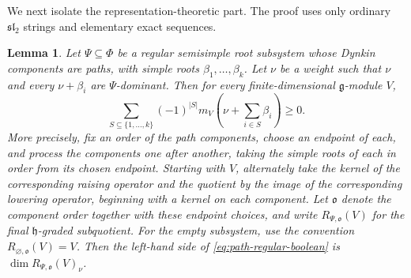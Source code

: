 \documentclass[11pt]{article}
\newtheorem{lemma}[lemma]{Lemma}
\theoremstyle{definition}
\theoremstyle{remark}
\newcommand{\Raiz}{\Phi}
\begin{document}
We next isolate the representation-theoretic part.  The proof uses only
ordinary $\mathfrak{sl}_2$ strings and elementary exact sequences.

\begin{lemma}\label{lem:path-regular-boolean}
Let $\Psi\subseteq\Raiz$ be a regular semisimple root subsystem whose Dynkin
components are paths, with simple roots $\beta_1,\ldots,\beta_k$.  Let $\nu$
be a weight such that $\nu$ and every $\nu+\beta_i$ are $\Psi$-dominant.  Then
for every finite-dimensional $\mathfrak g$-module $V$,
\begin{equation}\label{eq:path-regular-boolean}
   \sum_{S\subseteq\{1,\ldots,k\}}(-1)^{|S|}
      m_V\!\left(\nu+\sum_{i\in S}\beta_i\right)\ge0.
\end{equation}
More precisely, fix an order of the path components, choose an endpoint of
each, and process the components one after another, taking the simple roots of
each in order from its chosen endpoint.  Starting with $V$, alternately take
the kernel of the corresponding raising operator and the quotient by the image
of the corresponding lowering operator, beginning with a kernel on each
component.  Let $\mathfrak o$ denote the component order together with these
endpoint choices, and write $R_{\Psi,\mathfrak o}(V)$ for the final
$\mathfrak h$-graded subquotient.
For the empty subsystem, use the convention $R_{\varnothing,\mathfrak o}(V)=V$.
Then the left-hand side of \eqref{eq:path-regular-boolean} is
$\dim R_{\Psi,\mathfrak o}(V)_\nu$.
\end{lemma}
\end{document}
